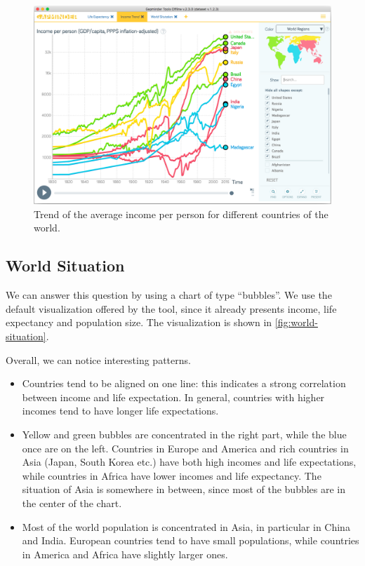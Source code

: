 \begin{figure}[h]
	\centering
	\includegraphics[width=0.95\columnwidth]{figures/income-trend}
	\caption{Trend of the average income per person for different countries of the world.}
	\label{fig:income-trend}
\end{figure}


\subsection{World Situation}
We can answer this question by using a chart of type ``bubbles''.
We use the default visualization offered by the tool, since it already presents income, life expectancy and population size.
The visualization is shown in \cref{fig:world-situation}.

Overall, we can notice interesting patterns.
\begin{itemize}
	\item Countries tend to be aligned on one line: this indicates a strong correlation between income and life expectation. In general, countries with higher incomes tend to have longer life expectations.
	\item Yellow and green bubbles are concentrated in the right part, while the blue once are on the left. Countries in Europe and America and rich countries in Asia (Japan, South Korea etc.) have both high incomes and life expectations, while countries in Africa have lower incomes and life expectancy. The situation of Asia is somewhere in between, since most of the bubbles are in the center of the chart.
	\item Most of the world population is concentrated in Asia, in particular in China and India. European countries tend to have small populations, while countries in America and Africa have slightly larger ones.
\end{itemize}

